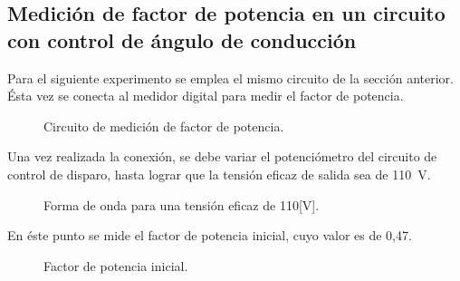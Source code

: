   \subsection{Medición de factor de potencia en un circuito con control de ángulo de conducción}

Para el siguiente experimento se emplea el mismo circuito de la sección anterior. 
Ésta vez se conecta al medidor digital para medir 
el factor de potencia.

\begin{figure}[H]
  \centering
  \caption{Circuito de medición de factor de potencia.}
  \label{fig:CircuitoMideFDP}
\end{figure}

Una vez realizada la conexión, se debe variar el potenciómetro del circuito 
de control de disparo, hasta lograr que la tensión eficaz de 
salida sea de 110~V.

\begin{figure}[H]
  \centering
  \caption{Forma de onda para una tensión eficaz de 110[V].}
  \label{fig:SeñalExp3}
\end{figure}

 En éste punto se mide el factor de potencia inicial, 
 cuyo valor es de 0,47.

 \begin{figure}[H]
  \centering
  \caption{Factor de potencia inicial.}
  \label{fig:FDPExp3}
\end{figure}

